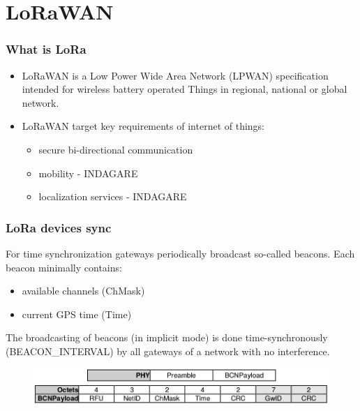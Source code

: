 \section{LoRaWAN}
  
\begin{frame}[fragile]
  \frametitle{What is LoRa}
  \begin{itemize}
      \item LoRaWAN is a Low Power Wide Area Network (LPWAN) specification intended for wireless battery operated Things in regional, national or global network. 
      \item LoRaWAN target key requirements of internet of things:
      \begin{itemize}
      	\item secure bi-directional communication
      	\item mobility - INDAGARE
      	\item localization services - INDAGARE
      \end{itemize}
  \end{itemize}
\end{frame}

\begin{frame}[fragile]
  \frametitle{LoRa devices sync}
  For time synchronization gateways periodically broadcast so-called beacons. Each beacon
  minimally contains:
  \begin{itemize}
      \item available channels (ChMask)
      \item current GPS time (Time)
      \end{itemize}
      The broadcasting of beacons (in implicit mode) is done time-synchronously (BEACON\_INTERVAL) by all gateways of a network with no interference.
      \begin{figure}
  \centering
  \includegraphics[width=\textwidth]{img/lora_beaconing.png}
  \end{figure}
\end{frame}

